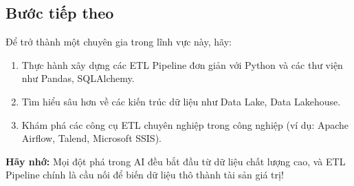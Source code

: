 \subsection{Bước tiếp theo}
Để trở thành một chuyên gia trong lĩnh vực này, hãy:
\begin{enumerate}
    \item Thực hành xây dựng các ETL Pipeline đơn giản với Python và các thư viện như Pandas, SQLAlchemy.
    \item Tìm hiểu sâu hơn về các kiến trúc dữ liệu như Data Lake, Data Lakehouse.
    \item Khám phá các công cụ ETL chuyên nghiệp trong công nghiệp (ví dụ: Apache Airflow, Talend, Microsoft SSIS).
\end{enumerate}

\textbf{Hãy nhớ:} Mọi đột phá trong AI đều bắt đầu từ dữ liệu chất lượng cao, và ETL Pipeline chính là cầu nối để biến dữ liệu thô thành tài sản giá trị!
